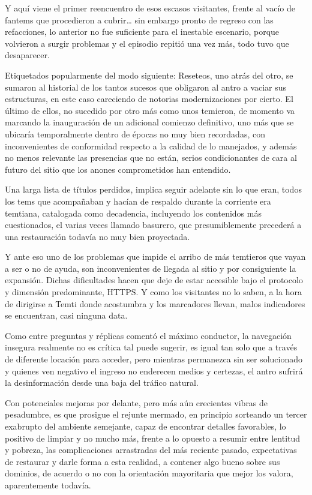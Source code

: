 \documentclass[
]{book}
\begin{document}
Y aquí viene el primer reencuentro de esos escasos visitantes, frente al vacío de fantems que procedieron a cubrir\ldots{} sin embargo pronto de regreso con las refacciones, lo anterior no fue suficiente para el inestable escenario, porque volvieron a surgir problemas y el episodio repitió una vez más, todo tuvo que desaparecer.

Etiquetados popularmente del modo siguiente: Reseteos, uno atrás del otro, se sumaron al historial de los tantos sucesos que obligaron al antro a vaciar sus estructuras, en este caso careciendo de notorias modernizaciones por cierto. El último de ellos, no sucedido por otro más como unos temieron, de momento va marcando la inauguración de un adicional comienzo definitivo, uno más que se ubicaría temporalmente dentro de épocas no muy bien recordadas, con inconvenientes de conformidad respecto a la calidad de lo manejados, y además no menos relevante las presencias que no están, serios condicionantes de cara al futuro del sitio que los anones comprometidos han entendido.

Una larga lista de títulos perdidos, implica seguir adelante sin lo que eran, todos los tems que acompañaban y hacían de respaldo durante la corriente era temtiana, catalogada como decadencia, incluyendo los contenidos más cuestionados, el varias veces llamado basurero, que presumiblemente precederá a una restauración todavía no muy bien proyectada.

Y ante eso uno de los problemas que impide el arribo de más temtieros que vayan a ser o no de ayuda, son inconvenientes de llegada al sitio y por consiguiente la expansión. Dichas dificultades hacen que deje de estar accesible bajo el protocolo y dimensión predominante, HTTPS. Y como los visitantes no lo saben, a la hora de dirigirse a Temti donde acostumbra y los marcadores llevan, malos indicadores se encuentran, casi ninguna data.

Como entre preguntas y réplicas comentó el máximo conductor, la navegación insegura realmente no es crítica tal puede sugerir, es igual tan solo que a través de diferente locación para acceder, pero mientras permanezca sin ser solucionado y quienes ven negativo el ingreso no enderecen medios y certezas, el antro sufrirá la desinformación desde una baja del tráfico natural.

Con potenciales mejoras por delante, pero más aún crecientes vibras de pesadumbre, es que prosigue el rejunte mermado, en principio sorteando un tercer exabrupto del ambiente semejante, capaz de encontrar detalles favorables, lo positivo de limpiar y no mucho más, frente a lo opuesto a resumir entre lentitud y pobreza, las complicaciones arrastradas del más reciente pasado, expectativas de restaurar y darle forma a esta realidad, a contener algo bueno sobre sus dominios, de acuerdo o no con la orientación mayoritaria que mejor los valora, aparentemente todavía.
\end{document}
